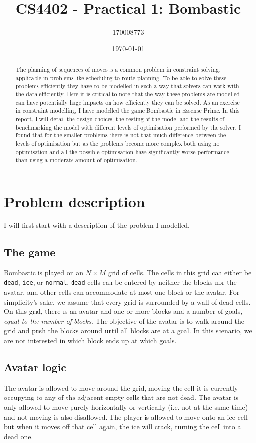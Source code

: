 \documentclass[british]{article}
\title{CS4402 - Practical 1: Bombastic}
\author{170008773}
\date{\today}
\newcommand{\code}[1]{\texttt{#1}}
\begin{document}
	\maketitle
	
	
	\begin{abstract}
		The planning of sequences of moves is a common problem in constraint solving,  applicable in problems like scheduling to route planning. To be able to solve these problems efficiently they have to be modelled in such a way that solvers can work with the data efficiently. Here it is critical to note that the way these problems are modelled can have potentially huge impacts on how efficiently they can be solved. As an exercise in constraint modelling, I have modelled the game Bombastic in Essense Prime. In this report, I will detail the design choices, the testing of the model and the results of benchmarking the model with different levels of optimisation performed by the solver. I found that for the smaller problems there is not that much difference between the levels of optimisation but as the problems become more complex both using no optimisation and all the possible optimisation have significantly worse performance than using a moderate amount of optimisation.  	
	\end{abstract}
	
	\section{Problem description}
	I will first start with a description of the problem I modelled. 
	\label{problem}
	\subsection{The game}
	Bombastic is played on an $N\times M$ grid of cells. The cells in this grid can either be \code{dead}, \code{ice}, or \code{normal}. \code{dead} cells can be entered by neither the blocks nor the avatar, and other cells can accommodate at most one block or the avatar. For simplicity's sake, we assume that every grid is surrounded by a wall of dead cells. On this grid, there is an avatar and one or more blocks and a number of goals, \textit{equal to the number of blocks}. The objective of the avatar is to walk around the grid and push the blocks around until all blocks are at a goal. In this scenario, we are not interested in which block ends up at which goals.  
	
	
	\subsection{Avatar logic}
	The avatar is allowed to move around the grid, moving the cell it is currently occupying to any of the adjacent empty cells that are not dead. The avatar is only allowed to move purely horizontally or vertically (i.e. not at the same time) and not moving is also disallowed.  The player is allowed to move onto an ice cell but when it moves off that cell again, the ice will crack, turning the cell into a dead one. 
	
\end{document}
